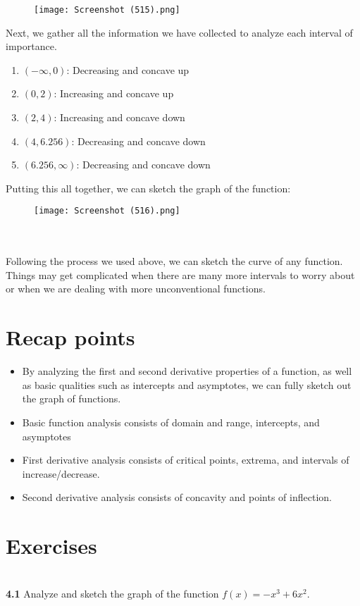 \documentclass[11pt]{scrartcl}
\begin{document}
\begin{figure}[htp]
    \centering
    \texttt{[image: Screenshot (515).png]}
\end{figure}
\newpage
\noindent 
Next, we gather all the information we have collected to analyze each interval of importance.
\begin{enumerate}
    \item $(-\infty, 0)$: Decreasing and concave up
    \item $(0, 2)$: Increasing and concave up
    \item $(2, 4)$: Increasing and concave down 
    \item $(4, 6.256)$: Decreasing and concave down 
    \item $(6.256, \infty)$: Decreasing and concave down 
\end{enumerate} 
\noindent 
Putting this all together, we can sketch the graph of the function: 
\begin{figure}[htp]
    \centering
    \texttt{[image: Screenshot (516).png]}
\end{figure} \\
\\
\noindent 
Following the process we used above, we can sketch the curve of any function. Things may get complicated when there are many more intervals to worry about or when we are dealing with more unconventional functions. 
\section{Recap points}
\begin{itemize}
    \item By analyzing the first and second derivative properties of a function, as well as basic qualities such as intercepts and asymptotes, we can fully sketch out the graph of functions. 
    \item Basic function analysis consists of domain and range, intercepts, and asymptotes 
    \item First derivative analysis consists of critical points, extrema, and intervals of increase/decrease. 
    \item Second derivative analysis consists of concavity and points of inflection. 
\end{itemize}
\section{Exercises}\\
\noindent 
\textbf{4.1} Analyze and sketch the graph of the function $f(x)=-x^3+6x^2$.
\end{document}

